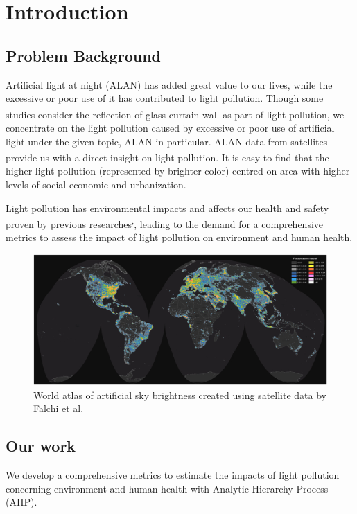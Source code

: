 \section{Introduction}

\subsection{Problem Background}
Artificial light at night (ALAN) has added great value to our lives, while the excessive or poor use of it has contributed to light pollution. Though some studies consider the reflection of glass curtain wall as part of light pollution\textsuperscript{\cite{ref1}}, we concentrate on the light pollution caused by excessive or poor use of artificial light under the given topic, ALAN in particular. ALAN data from satellites provide us with a direct insight on light pollution\textsuperscript{\cite{ref2}}. It is easy to find that the higher light pollution (represented by brighter color) centred on area with higher levels of social-economic and urbanization. \par 
Light pollution has environmental impacts and affects our health and safety proven by previous researches\textsuperscript{\cite{ref3},\cite{ref4}}, leading to the demand for a comprehensive metrics to assess the impact of light pollution on environment and human health. \par 
\begin{figure}[ht]
    \centering
    \includegraphics[width=\textwidth]{../pictures/1 Introduction/1 satellite data.jpg}
    \caption{World atlas of artificial sky brightness created using satellite data by Falchi et al.}
\end{figure}

\subsection{Our work}
We develop a comprehensive metrics to estimate the impacts of light pollution concerning environment and human health with Analytic Hierarchy Process (AHP).\par 
